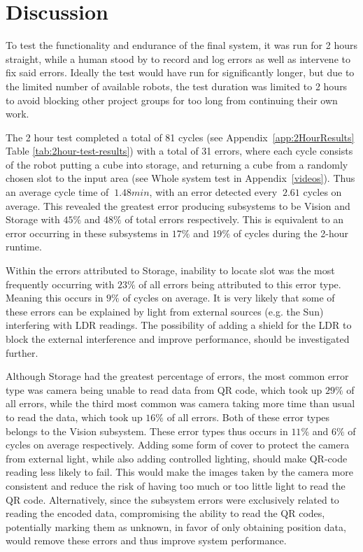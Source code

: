 \section{Discussion}
To test the functionality and endurance of the final system, it was run for 2 hours straight, while a human stood by to record and log errors as well as intervene to fix said errors.
Ideally the test would have run for significantly longer, but due to the limited number of available robots, the test duration was limited to 2 hours to avoid blocking other project groups for too long from continuing their own work.

The 2 hour test completed a total of 81 cycles (see Appendix~\ref{app:2HourResults} Table \ref{tab:2hour-test-results}) with a total of 31 errors, where each cycle consists of the robot putting a cube into storage, and returning a cube from a randomly chosen slot to the input area (see Whole system test in Appendix~\ref{videos}). Thus an average cycle time of $~1.48min$, with an error detected every $~2.61$ cycles on average.
This revealed the greatest error producing subsystems to be Vision and Storage with $45\%$ and $48\%$ of total errors respectively. This is equivalent to an error occurring in these subsystems in $17\%$ and $19\%$ of cycles during the 2-hour runtime.

Within the errors attributed to Storage, inability to locate slot was the most frequently occurring with $23\%$ of all errors being attributed to this error type. Meaning this occurs in $9\%$ of cycles on average.
It is very likely that some of these errors can be explained by light from external sources (e.g. the Sun) interfering with LDR readings. The possibility of adding a shield for the LDR to block the external interference and improve performance, should be investigated further.

Although Storage had the greatest percentage of errors, the most common error type was camera being unable to read data from QR code, which took up $29\%$ of all errors, while the third most common was camera taking more time than usual to read the data, which took up $16\%$ of all errors. Both of these error types belongs to the Vision subsystem. These error types thus occurs in $11\%$ and $6\%$ of cycles on average respectively. %
Adding some form of cover to protect the camera from external light, while also adding controlled lighting, should make QR-code reading less likely to fail. This would make the images taken by the camera more consistent and reduce the risk of having too much or too little light to read the QR code.
Alternatively, since the subsystem errors were exclusively related to reading the encoded data, compromising the ability to read the QR codes, potentially marking them as unknown, in favor of only obtaining position data, would remove these errors and thus improve system performance.

